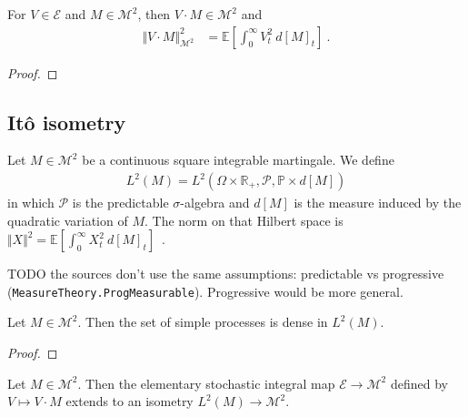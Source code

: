 \begin{lemma}\label{lem:sq_norm_elemStochIntegral}
For $V \in \mathcal{E}$ and $M \in \mathcal{M}^2$, then $V \cdot M \in \mathcal{M}^2$ and
\begin{align*}
  \Vert V \cdot M \Vert_{\mathcal{M}^2}^2
  &= \mathbb{E}\left[ \int_0^{\infty} V_t^2 \: d[M]_t \right]
  \: .
\end{align*}
\end{lemma}

\begin{proof}

\end{proof}


\subsection{Itô isometry}

\begin{definition}\label{def:L2M}
Let $M \in \mathcal{M}^2$ be a continuous square integrable martingale. We define
\begin{align*}
  L^2(M) = L^2(\Omega \times \mathbb{R}_+, \mathcal{P}, \mathbb{P} \times d[M])
\end{align*}
in which $\mathcal{P}$ is the predictable $\sigma$-algebra and $d[M]$ is the measure induced by the quadratic variation of $M$.
The norm on that Hilbert space is $\Vert X \Vert^2 = \mathbb{E}\left[ \int_0^{\infty} X_t^2 \: d[M]_t \right]$~.
\end{definition}

TODO the sources don't use the same assumptions: predictable vs progressive (\texttt{MeasureTheory.ProgMeasurable}). Progressive would be more general.


\begin{lemma}\label{lem:dense_simpleProcess}
Let $M \in \mathcal{M}^2$. Then the set of simple processes is dense in $L^2(M)$.
\end{lemma}

\begin{proof}

\end{proof}


\begin{definition}\label{def:itoIsometry}
Let $M \in \mathcal{M}^2$. Then the elementary stochastic integral map $\mathcal{E} \to \mathcal{M}^2$ defined by $V \mapsto V \cdot M$ extends to an isometry $L^2(M) \to \mathcal{M}^2$.
\end{definition}


